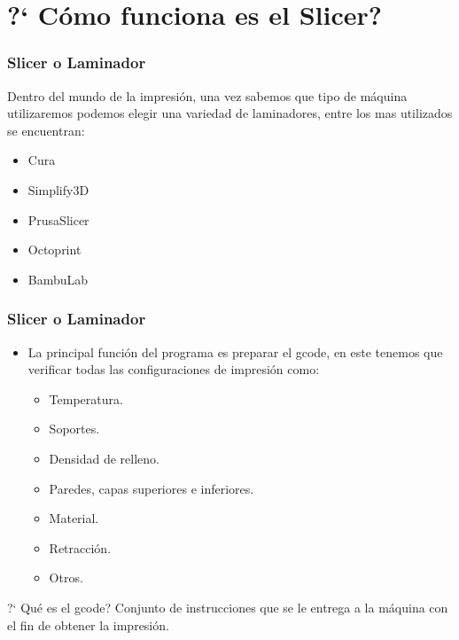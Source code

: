 \documentclass{beamer}
\begin{document}
\section{?` C\'omo funciona es el Slicer?}
\begin{frame}[allowframebreaks]
\frametitle{Slicer o Laminador}
Dentro del mundo de la impresi\'on, una vez sabemos que tipo de m\'aquina utilizaremos podemos elegir una variedad de laminadores, entre los mas utilizados se encuentran:
\begin{itemize}
    \item Cura 
    \item Simplify3D
    \item PrusaSlicer
    \item Octoprint
    \item BambuLab
\end{itemize}
\end{frame}

\begin{frame}[allowframebreaks]
\frametitle{Slicer o Laminador}
\begin{itemize}
    \item La principal funci\'on del programa es preparar el gcode, en este tenemos que verificar todas las configuraciones de impresi\'on como: 
    \begin{itemize}
        \item Temperatura.
        \item Soportes.
        \item Densidad de relleno.
        \item Paredes, capas superiores e inferiores.
        \item Material.
        \item Retracci\'on.
        \item Otros.
    \end{itemize} 
\end{itemize}
\end{frame}
\begin{frame}{?` Qu\'e es el gcode?}
    Conjunto de instrucciones que se le entrega a la m\'aquina con el fin de obtener la impresi\'on.
\end{frame}
\end{document}
